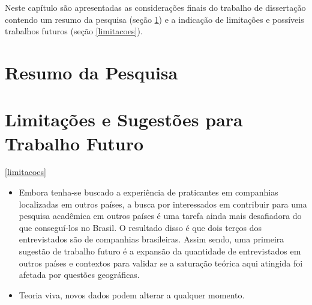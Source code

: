 Neste capítulo são apresentadas as considerações finais do trabalho de
dissertação contendo um resumo da pesquisa (seção \ref{resumo_pesquisa})
e a indicação de limitações e possíveis trabalhos futuros (seção \ref{limitacoes}).

\section{Resumo da Pesquisa}\label{resumo_pesquisa}

\section{Limitações e Sugestões para Trabalho Futuro}\ref{limitacoes}

\begin{itemize}
\item Embora tenha-se buscado a experiência de praticantes em companhias
localizadas em outros países, a busca por interessados em contribuir para uma
pesquisa acadêmica em outros países é uma tarefa ainda mais desafiadora do que
conseguí-los no Brasil. O resultado disso é que dois terços dos entrevistados
são de companhias brasileiras. Assim sendo, uma primeira sugestão de trabalho
futuro é a expansão da quantidade de entrevistados em outros países e contextos
para validar se a saturação teórica aqui atingida foi afetada por questões
geográficas.

\item Teoria viva, novos dados podem alterar a qualquer momento.
\end{itemize}
